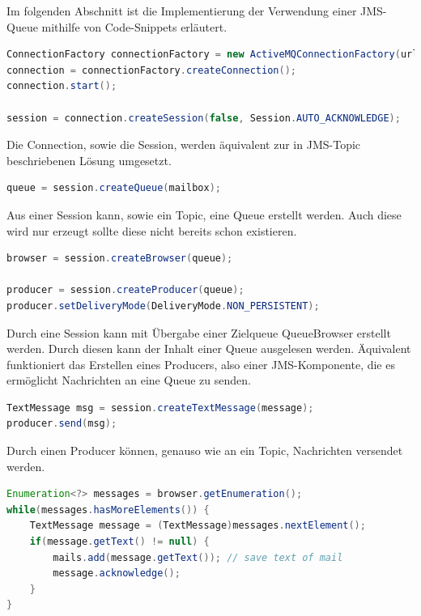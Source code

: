 \documentclass[11pt, a4paper]{article}
\begin{document}
Im folgenden Abschnitt ist die Implementierung der Verwendung einer JMS-Queue mithilfe von Code-Snippets erläutert.

\begin{lstlisting}[language=Java]
ConnectionFactory connectionFactory = new ActiveMQConnectionFactory(url);
connection = connectionFactory.createConnection();
connection.start();
			
session = connection.createSession(false, Session.AUTO_ACKNOWLEDGE);
\end{lstlisting}

Die Connection, sowie die Session, werden äquivalent zur in JMS-Topic beschriebenen Lösung umgesetzt.

\begin{lstlisting}[language=Java]
queue = session.createQueue(mailbox);
\end{lstlisting}

Aus einer Session kann, sowie ein Topic, eine Queue erstellt werden. Auch diese wird nur erzeugt sollte diese nicht bereits schon existieren.

\begin{lstlisting}[language=Java]
browser = session.createBrowser(queue);

producer = session.createProducer(queue);
producer.setDeliveryMode(DeliveryMode.NON_PERSISTENT);
\end{lstlisting}

Durch eine Session kann mit Übergabe einer Zielqueue QueueBrowser erstellt werden. Durch diesen kann der Inhalt einer Queue ausgelesen werden.
Äquivalent funktioniert das Erstellen eines Producers, also einer JMS-Komponente, die es ermöglicht Nachrichten an eine Queue zu senden.

\begin{lstlisting}[language=Java]
TextMessage msg = session.createTextMessage(message);
producer.send(msg);
\end{lstlisting}

Durch einen Producer können, genauso wie an ein Topic, Nachrichten versendet werden.

\begin{lstlisting}[language=Java]
Enumeration<?> messages = browser.getEnumeration();
while(messages.hasMoreElements()) {
	TextMessage message = (TextMessage)messages.nextElement();
	if(message.getText() != null) {
		mails.add(message.getText()); // save text of mail
		message.acknowledge();
	}
}
\end{lstlisting}
\end{document}
